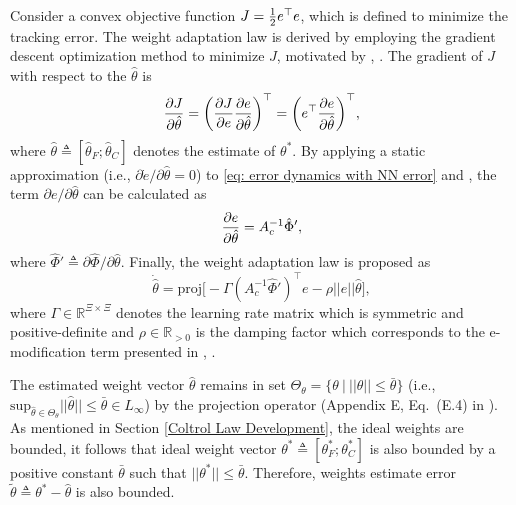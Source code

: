 \documentclass[letterpaper, 10 pt, conference]{ieeeconf}  %
\begin{document}
Consider a convex objective function $J={1\over 2}e^\top  e$, which is defined to minimize the tracking error. The weight adaptation law is derived by employing the gradient descent optimization method to minimize $J$, motivated by \cite{BookEKcontrol}, \cite{BoockEKestimation}. The gradient of $J$ with respect to the $\hat\theta$ is 
\begin{equation} 
    {\partial J\over\partial \hat\theta} = 
    \bigg(
    {\partial J\over\partial e}{\partial e\over\partial \hat\theta}
    \bigg)^\top   
    =
    \bigg(
    e^\top  {\partial e\over\partial \hat\theta}
    \bigg)^\top  
    ,
\end{equation}
where $\hat\theta\triangleq [\hat\theta_F;\hat\theta_C]$ denotes the estimate of $\theta^*$. 
By applying a static approximation (i.e., $\partial\dot e/\partial \hat\theta = 0$) to \eqref{eq: error dynamics with NN error} and
, the term $\partial e/\partial \hat\theta$ can be calculated as
\begin{equation}
    {\partial e\over\partial \hat\theta} = A_c^{-1} \hat\Phi',
\end{equation}
where $\hat\Phi'\triangleq \partial\hat\Phi/\partial\hat\theta$.
Finally, the weight adaptation law is proposed as 
\begin{equation}
        \dot{\hat \theta} =
            \text{proj}
            \bigg[
            -\Gamma 
            (A_c^{-1}\hat\Phi')^\top   e 
            -\rho||e|| \hat\theta
            \bigg]
        ,
    \label{eq: adaptation law}
\end{equation}
where $\Gamma\in\mathbb{R}^{\Xi\times \Xi}$ denotes the learning rate matrix which is symmetric and positive-definite and $\rho\in\mathbb{R}_{>0}$ is the damping factor which corresponds to the e-modification term presented in \cite{BookEKcontrol}, \cite{BoockEKestimation}. 

The estimated weight vector $\hat\theta$ remains in set $\Theta_{\theta}=\{\theta \ |\  ||\theta||\le\bar\theta\}$ (i.e., $\text{sup}_{\hat\theta\in\Theta_{\theta}} ||\hat\theta|| \le \bar \theta\in L_\infty$) by the projection operator (Appendix E, Eq.~(E.4) in \cite{BookProjection}).
As mentioned in Section \ref{Coltrol Law Development}, the ideal weights are bounded, it follows that ideal weight vector $\theta^*\triangleq[\theta^*_F;\theta_C^*]$ is also bounded by a positive constant $\bar\theta$ such that $||\theta^*||\le\bar\theta$. 
Therefore, weights estimate error $\tilde\theta\triangleq\theta^*-\hat\theta$ is also bounded.
\end{document}
